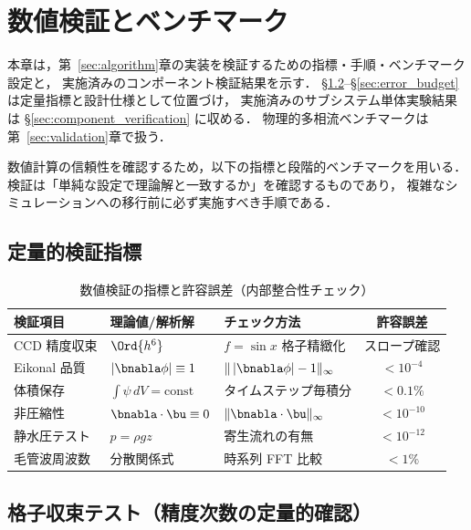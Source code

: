 \section{数値検証とベンチマーク}
\label{sec:verification}

本章は，第~\ref{sec:algorithm}章の実装を検証するための指標・手順・ベンチマーク設定と，
実施済みのコンポーネント検証結果を示す．
§\ref{sec:grid_convergence}--§\ref{sec:error_budget} は定量指標と設計仕様として位置づけ，
実施済みのサブシステム単体実験結果は §\ref{sec:component_verification} に収める．
物理的多相流ベンチマークは第~\ref{sec:validation}章で扱う．

数値計算の信頼性を確認するため，以下の指標と段階的ベンチマークを用いる．
検証は「単純な設定で理論解と一致するか」を確認するものであり，
複雑なシミュレーションへの移行前に必ず実施すべき手順である．

\subsection{定量的検証指標}

\begin{table}[htbp]
\centering
\caption{数値検証の指標と許容誤差（内部整合性チェック）}
\label{tab:verification}
\begin{tabular}{p{35mm}p{40mm}p{35mm}c}
\toprule
検証項目 & 理論値/解析解 & チェック方法 & 許容誤差 \\
\midrule
CCD 精度収束 & $\Ord{h^6}$ & $f=\sin x$ 格子精緻化 & スロープ確認\\
Eikonal 品質 & $|\bnabla\phi| \equiv 1$ & $\|\,|\bnabla\phi|-1\|_\infty$ & $< 10^{-4}$\\
体積保存 & $\int\psi\,dV = \text{const}$ & タイムステップ毎積分 & $< 0.1\%$\\
非圧縮性 & $\bnabla\cdot\bu \equiv 0$ & $\|\bnabla\cdot\bu\|_\infty$ & $< 10^{-10}$\\
静水圧テスト & $p = \rho g z$ & 寄生流れの有無 & $< 10^{-12}$\\
毛管波周波数 & 分散関係式 & 時系列 FFT 比較 & $< 1\%$\\
\bottomrule
\end{tabular}
\end{table}

\subsection{格子収束テスト（精度次数の定量的確認）}
\label{sec:grid_convergence}

